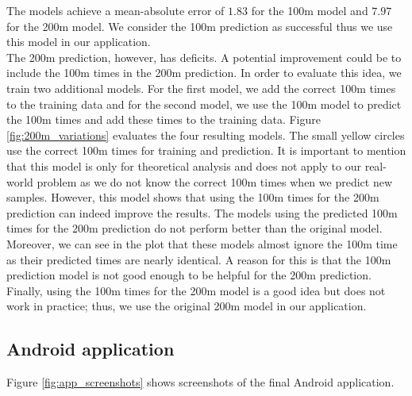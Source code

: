 The models achieve a mean-absolute error of $1.83$ for the 100m model and $7.97$ for the 200m model. We consider the 100m prediction as successful thus we use this model in our application.\\
The 200m prediction, however, has deficits. A potential improvement could be to include the 100m times in the 200m prediction. In order to evaluate this idea, we train two additional models. For the first model, we add the correct 100m times to the training data and for the second model, we use the 100m model to predict the 100m times and add these times to the training data. Figure \ref{fig:200m_variations} evaluates the four resulting models. The small yellow circles use the correct 100m times for training and prediction. It is important to mention that this model is only for theoretical analysis and does not apply to our real-world problem as we do not know the correct 100m times when we predict new samples. However, this model shows that using the 100m times for the 200m prediction can indeed improve the results. The models using the predicted 100m times for the 200m prediction do not perform better than the original model. Moreover, we can see in the plot that these models almost ignore the 100m time as their predicted times are nearly identical. A reason for this is that the 100m prediction model is not good enough to be helpful for the 200m prediction. Finally, using the 100m times for the 200m model is a good idea but does not work in practice; thus, we use the original 200m model in our application.
\subsection{Android application}
Figure \ref{fig:app_screenshots} shows screenshots of the final Android application. 

